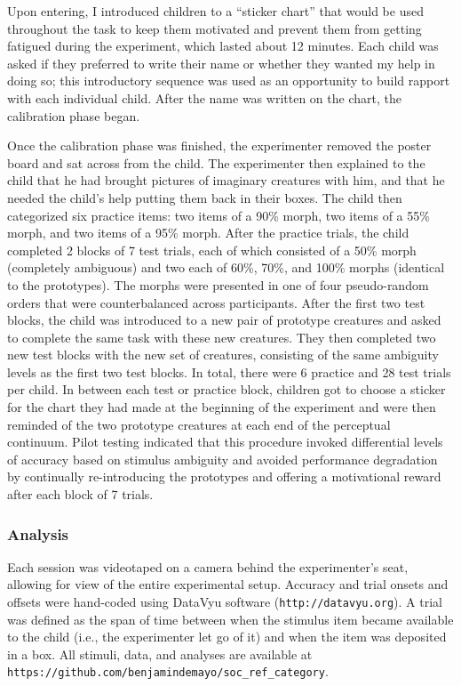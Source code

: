 \documentclass[floatsintext,man]{apa6}
\theoremstyle{definition}
\theoremstyle{definition}
\theoremstyle{definition}
\theoremstyle{remark}
\begin{document}
Upon entering, I introduced children to a \enquote{sticker chart} that
would be used throughout the task to keep them motivated and prevent
them from getting fatigued during the experiment, which lasted about 12
minutes. Each child was asked if they preferred to write their name or
whether they wanted my help in doing so; this introductory sequence was
used as an opportunity to build rapport with each individual child.
After the name was written on the chart, the calibration phase began.

Once the calibration phase was finished, the experimenter removed the
poster board and sat across from the child. The experimenter then
explained to the child that he had brought pictures of imaginary
creatures with him, and that he needed the child's help putting them
back in their boxes. The child then categorized six practice items: two
items of a 90\% morph, two items of a 55\% morph, and two items of a
95\% morph. After the practice trials, the child completed 2 blocks of 7
test trials, each of which consisted of a 50\% morph (completely
ambiguous) and two each of 60\%, 70\%, and 100\% morphs (identical to
the prototypes). The morphs were presented in one of four pseudo-random
orders that were counterbalanced across participants. After the first
two test blocks, the child was introduced to a new pair of prototype
creatures and asked to complete the same task with these new creatures.
They then completed two new test blocks with the new set of creatures,
consisting of the same ambiguity levels as the first two test blocks. In
total, there were 6 practice and 28 test trials per child. In between
each test or practice block, children got to choose a sticker for the
chart they had made at the beginning of the experiment and were then
reminded of the two prototype creatures at each end of the perceptual
continuum. Pilot testing indicated that this procedure invoked
differential levels of accuracy based on stimulus ambiguity and avoided
performance degradation by continually re-introducing the prototypes and
offering a motivational reward after each block of 7 trials.

\subsubsection{Analysis}\label{analysis}

Each session was videotaped on a camera behind the experimenter's seat,
allowing for view of the entire experimental setup. Accuracy and trial
onsets and offsets were hand-coded using DataVyu software
(\texttt{http://datavyu.org}). A trial was defined as the span of time
between when the stimulus item became available to the child (i.e., the
experimenter let go of it) and when the item was deposited in a box. All
stimuli, data, and analyses are available at
\texttt{https://github.com/benjamindemayo/soc\_ref\_category}.
\end{document}
